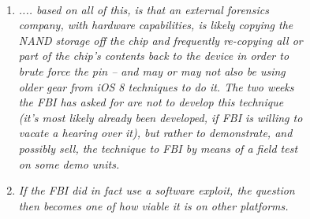 \begin{figure}[htb]
    \begin{minipage}{0.6\textwidth} 
 \begin{description}
        \item[\parbox{\textwidth} {Der Sicherheitsforscher Zdziarski beschreibt in seinen Abhandlungen die plausiblen Varianten des FBI Hacks wie folgt}]~\par
        \begin{enumerate}
            \item \textit{\glqq .... based on all of this, is that an external forensics company, with hardware capabilities, is likely copying the NAND storage off the chip and frequently re-copying all or part of the chip’s contents back to the device in order to brute force the pin – and may or may not also be using older gear from iOS 8 techniques to do it. The two weeks the FBI has asked for are not to develop this technique (it’s most likely already been developed, if FBI is willing to vacate a hearing over it), but rather to demonstrate, and possibly sell, the technique to FBI by means of a field test on some demo units.\grqq{}} \cite{Hacking[4]}
            \item \textit{\glqq If the FBI did in fact use a software exploit, the question then becomes one of how viable it is on other platforms.\grqq{}} \cite{Hacking[4]}
        \end{enumerate}
    \end{description}     
    \end{minipage}
	\hfil
	\begin{minipage}{0.4\textwidth}

\end{minipage}
\end{figure}
